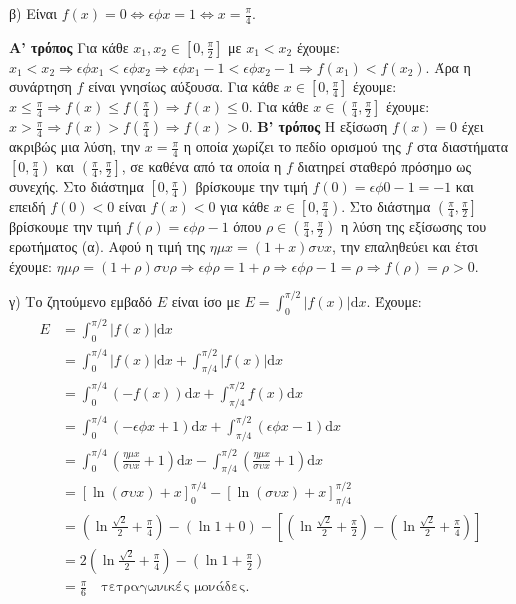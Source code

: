 \begin{alist}
\item β) Είναι $f(x)=0 \Leftrightarrow \epsilon\phi x=1 \Leftrightarrow x=\frac{\pi}{4}$.
    \begin{center}
    \end{center}
    \textbf{Α' τρόπος}
    Για κάθε $x_1, x_2 \in \left[0, \frac{\pi}{2}\right]$ με $x_1 < x_2$ έχουμε:
    $x_1 < x_2 \Rightarrow \epsilon\phi x_1 < \epsilon\phi x_2 \Rightarrow \epsilon\phi x_1-1 < \epsilon\phi x_2-1 \Rightarrow f(x_1) < f(x_2)$.
    Άρα η συνάρτηση $f$ είναι γνησίως αύξουσα.
    Για κάθε $x \in \left[0, \frac{\pi}{4}\right]$ έχουμε: $x \le \frac{\pi}{4} \Rightarrow f(x) \le f\left(\frac{\pi}{4}\right) \Rightarrow f(x) \le 0$.
    Για κάθε $x \in \left(\frac{\pi}{4}, \frac{\pi}{2}\right]$ έχουμε: $x > \frac{\pi}{4} \Rightarrow f(x) > f\left(\frac{\pi}{4}\right) \Rightarrow f(x) > 0$.
    \textbf{Β' τρόπος}
    Η εξίσωση $f(x)=0$ έχει ακριβώς μια λύση, την $x=\frac{\pi}{4}$ η οποία χωρίζει το πεδίο ορισμού της $f$ στα διαστήματα $\left[0, \frac{\pi}{4}\right)$ και $\left(\frac{\pi}{4}, \frac{\pi}{2}\right]$, σε καθένα από τα οποία η $f$ διατηρεί σταθερό πρόσημο ως συνεχής.
    Στο διάστημα $\left[0, \frac{\pi}{4}\right)$ βρίσκουμε την τιμή $f(0)=\epsilon\phi 0-1=-1$ και επειδή $f(0)<0$ είναι $f(x)<0$ για κάθε $x \in \left[0, \frac{\pi}{4}\right)$.
    Στο διάστημα $\left(\frac{\pi}{4}, \frac{\pi}{2}\right]$ βρίσκουμε την τιμή $f(\rho)=\epsilon\phi\rho-1$ όπου $\rho \in \left(\frac{\pi}{4}, \frac{\pi}{2}\right)$ η λύση της εξίσωσης του ερωτήματος (α). Αφού η τιμή της $\eta\mu x=(1+x)\sigma\upsilon x$, την επαληθεύει και έτσι έχουμε:
    $\eta\mu\rho = (1+\rho)\sigma\upsilon\rho \Rightarrow \epsilon\phi\rho = 1+\rho \Rightarrow \epsilon\phi\rho-1 = \rho \Rightarrow f(\rho)=\rho > 0$.
\item γ) Το ζητούμενο εμβαδό $E$ είναι ίσο με $E=\int_0^{\pi/2}|f(x)|\text{d}x$.
    Έχουμε:
    \[
    \begin{aligned}
    E &= \int_0^{\pi/2}|f(x)|\text{d}x \\
    &= \int_0^{\pi/4}|f(x)|\text{d}x + \int_{\pi/4}^{\pi/2}|f(x)|\text{d}x \\
    &= \int_0^{\pi/4}(-f(x))\text{d}x + \int_{\pi/4}^{\pi/2}f(x)\text{d}x \\
    &= \int_0^{\pi/4}(-\epsilon\phi x+1)\text{d}x + \int_{\pi/4}^{\pi/2}(\epsilon\phi x-1)\text{d}x \\
    &= \int_0^{\pi/4}\left(\frac{\eta\mu x}{\sigma\upsilon x}+1\right)\text{d}x - \int_{\pi/4}^{\pi/2}\left(\frac{\eta\mu x}{\sigma\upsilon x}+1\right)\text{d}x \\
    &= [\ln(\sigma\upsilon x)+x]_0^{\pi/4} - [\ln(\sigma\upsilon x)+x]_{\pi/4}^{\pi/2} \\
    &= \left(\ln\frac{\sqrt{2}}{2}+\frac{\pi}{4}\right) - (\ln 1+0) - \left[\left(\ln\frac{\sqrt{2}}{2}+\frac{\pi}{2}\right) - \left(\ln\frac{\sqrt{2}}{2}+\frac{\pi}{4}\right)\right] \\
    &= 2\left(\ln\frac{\sqrt{2}}{2}+\frac{\pi}{4}\right) - \left(\ln 1+\frac{\pi}{2}\right) \\
    &= \frac{\pi}{6} \quad \text{τετραγωνικές μονάδες.}
    \end{aligned}
    \]
\end{alist}